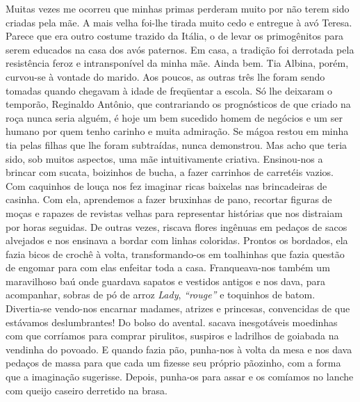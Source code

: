 Muitas vezes me ocorreu que minhas primas perderam muito por não terem sido criadas pela mãe.
A mais velha foi-lhe tirada muito cedo e entregue à avó Teresa.
Parece que era outro costume trazido da Itália, o de levar os primogênitos para serem educados na casa dos avós paternos.
Em casa, a tradição foi derrotada pela resistência feroz e intransponível da minha mãe.
Ainda bem.
Tia Albina, porém, curvou-se à vontade do marido.
Aos poucos, as outras três lhe foram sendo tomadas quando chegavam à idade de freqüentar a escola.
Só lhe deixaram o temporão, Reginaldo Antônio, que contrariando os prognósticos de que criado na roça nunca seria alguém, é hoje um bem sucedido homem de negócios e um ser humano por quem tenho carinho e muita admiração.
Se mágoa restou em minha tia pelas filhas que lhe foram subtraídas, nunca demonstrou.
Mas acho que teria sido, sob muitos aspectos, uma mãe intuitivamente criativa.
Ensinou-nos a brincar com sucata, boizinhos de bucha, a fazer carrinhos de carretéis vazios.
Com caquinhos de louça nos fez imaginar ricas baixelas nas brincadeiras de casinha.
Com ela, aprendemos a fazer bruxinhas de pano, recortar figuras de moças e rapazes de revistas velhas para representar histórias que nos distraiam por horas seguidas.
De outras vezes, riscava flores ingênuas em pedaços de sacos alvejados e nos ensinava a bordar com linhas coloridas.
Prontos os bordados, ela fazia bicos de crochê à volta, transformando-os em toalhinhas que fazia questão de engomar para com elas enfeitar toda a casa.
Franqueava-nos também um maravilhoso baú onde guardava sapatos e vestidos antigos e nos dava, para acompanhar, sobras de pó de arroz \textit{Lady}, \textit{``rouge''} e toquinhos de batom.
Divertia-se vendo-nos encarnar madames, atrizes e princesas, convencidas de que estávamos deslumbrantes! Do bolso do avental.
sacava inesgotáveis moedinhas com que corríamos para comprar pirulitos, suspiros e ladrilhos de goiabada na vendinha do povoado.
E quando fazia pão, punha-nos à volta da mesa e nos dava pedaços de massa para que cada um fizesse seu próprio pãozinho, com a forma que a imaginação sugerisse.
Depois, punha-os para assar e os comíamos no lanche com queijo caseiro derretido na brasa.


